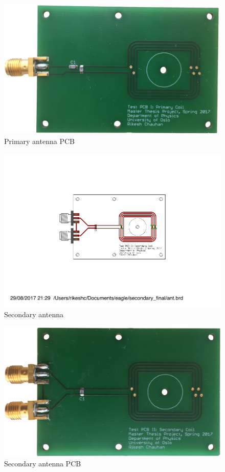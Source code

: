 \documentclass[12pt,a4paper,UKenglish]{report}
\begin{document}
\begin{appendices}
\begin{figure} [!htbp]	%
 	\centering
  	\includegraphics[width=1\textwidth]{pcb/test_pri.png} 
 	\caption{Primary antenna PCB} 
	\label{fig:appen_primary_pcb} 
\end{figure}

\begin{figure} [!htbp]	%
 	\centering
  	\includegraphics[width=1\textwidth]{appendix/pcb_sec.pdf} 
 	\caption{Secondary antenna} 
	\label{fig:appen_secondary} 
\end{figure}

\begin{figure} [!htbp]	%
 	\centering
  	\includegraphics[width=1\textwidth]{pcb/test_sec.png} 
 	\caption{Secondary antenna PCB} 
	\label{fig:appen_secondary_pcb} 
\end{figure}


\end{appendices}
\end{document}
